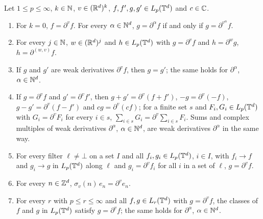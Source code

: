 \begin{lemma}
\label{lem:torus-weak-line-derivative-basic}
\leanok
{}
Let $1 \leq p \leq \infty$, $k \in \mathbb{N}$, $v \in (\mathbb{R}^d)^k$, $f, f', g, g' \in L_p(\mathbb{T}^d)$ and
$c \in \mathbb{C}$.
\begin{enumerate}
  \item For $k = 0$, $f = \partial^v f$. For every $\alpha \in \mathbb{N}^d$, $g = \partial^\alpha f$ if
    and only if $g = \partial^{v^\alpha} f$.
  \item For every $j \in \mathbb{N}$, $w \in (\mathbb{R}^d)^j$ and $h \in L_p(\mathbb{T}^d)$ with $g = \partial^v f$ and
    $h = \partial^w g$, $h = \partial^{(w, v)} f$.
  \item If $g$ and $g'$ are weak derivatives $\partial^v f$, then $g = g'$; the
    same holds for $\partial^\alpha$, $\alpha \in \mathbb{N}^d$.
  \item If $g = \partial^v f$ and $g' = \partial^v f'$, then $g + g' = \partial^v (f + f')$,
    $-g = \partial^v (-f)$, $g - g' = \partial^v (f - f')$ and $c g = \partial^v (c f)$; for a
    finite set $s$ and $F_i, G_i \in L_p(\mathbb{T}^d)$ with $G_i = \partial^v F_i$ for every $i \in s$,
    $\sum_{i \in s} G_i = \partial^v \sum_{i \in s} F_i$. Sums and complex multiples of weak
    derivatives $\partial^\alpha$, $\alpha \in \mathbb{N}^d$, are weak derivatives $\partial^\alpha$ in
    the same way.
  \item For every filter $\ell \neq \bot$ on a set $I$ and all $f_i, g_i \in L_p(\mathbb{T}^d)$,
    $i \in I$, with $f_i \to f$ and $g_i \to g$ in $L_p(\mathbb{T}^d)$ along $\ell$ and
    $g_i = \partial^v f_i$ for all $i$ in a set of $\ell$, $g = \partial^v f$.
  \item For every $n \in \mathbb{Z}^d$, $\sigma_v(n) \, e_n = \partial^v e_n$.
  \item For every $r$ with $p \leq r \leq \infty$ and all $f, g \in L_r(\mathbb{T}^d)$ with
    $g = \partial^v f$, the classes of $f$ and $g$ in $L_p(\mathbb{T}^d)$ satisfy $g = \partial^v f$;
    the same holds for $\partial^\alpha$, $\alpha \in \mathbb{N}^d$.
\end{enumerate}
\end{lemma}

